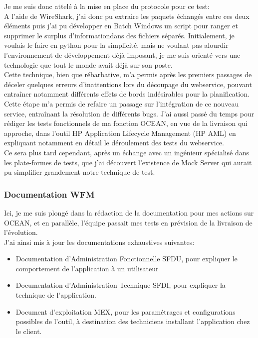 \documentclass{rapport}
\begin{document}
Je me suis donc attelé à la mise en place du protocole pour ce test:\\
A l'aide de WireShark, j'ai donc pu extraire les paquets échangés entre ces deux éléments puis j'ai pu développer en Batch Windows un script pour ranger et supprimer le surplus d'informationdans des fichiers séparés. Initialement, je voulais le faire en python pour la simplicité, mais ne voulant pas alourdir l'environnement de développement déjà imposant, je me suis orienté vers une technologie que tout le monde avait déjà sur son poste. \\


Cette technique, bien que rébarbative, m'a permis après les premiers passages de déceler quelques erreurs d'inattentions lors du découpage du webservice, pouvant entraîner notamment différents effets de bords indésirables pour la planification.\\

Cette étape m'a permis de refaire un passage sur l'intégration de ce nouveau service, entraînant la résolution de différents bugs. J'ai aussi passé du temps pour rédiger les tests fonctionnels de ma fonction OCEAN, en vue de la livraison qui approche, dans l'outil HP Application Lifecycle Management (HP AML) en expliquant notamment en détail le déroulement des tests du webservice.\\

Ce sera plus tard cependant, après un échange avec un ingénieur spécialisé dans les plate-formes de tests, que j'ai découvert l'existence de Mock Server qui aurait pu simplifier grandement notre technique de test.

\subsubsection{Documentation WFM}

Ici, je me suis plongé dans la rédaction de la documentation pour mes actions sur OCEAN, et en  parallèle, l'équipe passait mes tests en prévision de la livraison de l'évolution.\\

J'ai ainsi mis à jour les documentations exhaustives suivantes:
    \begin{itemize}
        \item Documentation d'Administration Fonctionnelle SFDU, pour expliquer le comportement de l'application à un utilisateur
        \item Documentation d'Administration Technique SFDI, pour expliquer la technique de l'application.
        \item Document d'exploitation MEX, pour les paramétrages et configurations possibles de l'outil, à destination des techniciens installant l'application chez le client.
    \end{itemize}
\end{document}
